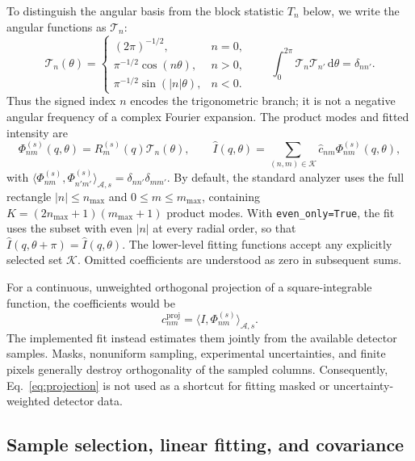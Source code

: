 \documentclass[aps,prb,preprint,onecolumn,notitlepage,amsmath,amssymb,
  superscriptaddress,floatfix]{revtex4-2}
\newcommand{\dd}{\,\mathrm{d}}
\newcommand{\Ann}{\mathcal{A}}
\newcommand{\Modes}{\mathcal{K}}
\begin{document}
To distinguish the angular basis from the block statistic $T_n$ below,
we write the angular functions as $\mathcal{T}_n$:
\begin{equation}
 \mathcal{T}_n(\theta)=
 \begin{cases}
 (2\pi)^{-1/2},&n=0,\\
 \pi^{-1/2}\cos(n\theta),&n>0,\\
 \pi^{-1/2}\sin(|n|\theta),&n<0.
 \end{cases}
 \qquad
 \int_0^{2\pi}\mathcal{T}_n\mathcal{T}_{n'}\dd\theta=\delta_{nn'}.
 \label{eq:angular-modes}
\end{equation}
Thus the signed index $n$ encodes the trigonometric branch; it is not a
negative angular frequency of a complex Fourier expansion. The product modes
and fitted intensity are
\begin{equation}
 \Phi_{nm}^{(s)}(q,\theta)=R_m^{(s)}(q)\mathcal{T}_n(\theta),\qquad
 \widehat I(q,\theta)=\sum_{(n,m)\in\Modes}
 \widehat c_{nm}\Phi_{nm}^{(s)}(q,\theta),
 \label{eq:expansion}
\end{equation}
with $\langle\Phi_{nm}^{(s)},\Phi_{n'm'}^{(s)}\rangle_{\Ann,s}
=\delta_{nn'}\delta_{mm'}$. By default, the standard analyzer uses the full
rectangle $|n|\leq n_{\max}$ and $0\leq m\leq m_{\max}$, containing
$K=(2n_{\max}+1)(m_{\max}+1)$ product modes. With \texttt{even\_only=True},
the fit uses the subset with even $|n|$ at every radial order, so that
$\widehat I(q,\theta+\pi)=\widehat I(q,\theta)$. The lower-level fitting
functions accept any explicitly selected set $\Modes$. Omitted coefficients
are understood as zero in subsequent sums.

For a continuous, unweighted orthogonal projection of a square-integrable
function, the coefficients would be
\begin{equation}
 c_{nm}^{\mathrm{proj}}=\langle I,\Phi_{nm}^{(s)}\rangle_{\Ann,s}.
 \label{eq:projection}
\end{equation}
The implemented fit instead estimates them jointly from the available
detector samples. Masks, nonuniform sampling, experimental uncertainties,
and finite pixels generally destroy orthogonality of the sampled columns.
Consequently, Eq.~\eqref{eq:projection} is not used as a shortcut for fitting
masked or uncertainty-weighted detector data.

\subsection{Sample selection, linear fitting, and covariance}
\end{document}
